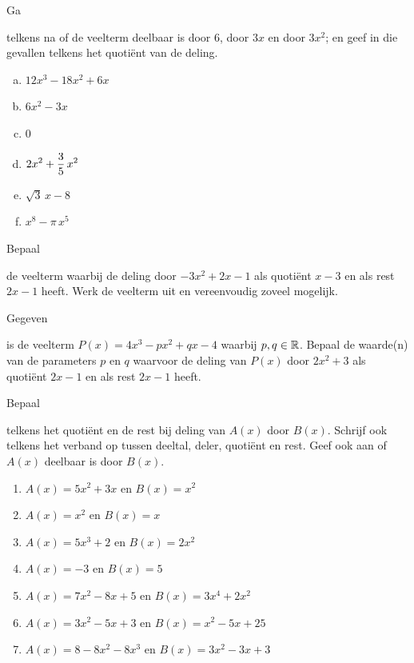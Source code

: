 \documentclass{ximera}
\begin{document}
\begin{exercise} 
\hypertarget{oef2.2}{Ga} telkens na of de veelterm deelbaar is door $6$, door $3x$ en door $3x^2$; en geef in die gevallen telkens het quoti\"ent van de deling.
\begin{multicols}{2}
\begin{enumerate}[(a)]
\item
$12x^3-18x^2+6x$
\item
$6x^2-3x$
\item
$0$
\item
$\displaystyle 2x^2+\frac{3}{5}\,x^2$
\item
$\sqrt{3}\,x-8$
\item
$x^8-\pi\,x^5$
\end{enumerate}
\end{multicols}
\end{exercise} 

\begin{exercise} 
\hypertarget{oef2.3}{Bepaal} de veelterm waarbij de deling door $-3x^2+2x-1$ als quoti\"ent $x-3$ en als rest $2x-1$ heeft. Werk de veelterm uit en vereenvoudig zoveel mogelijk.
\end{exercise} 

\begin{exercise} 
\hypertarget{oef2.4}{Gegeven} is de veelterm $P(x) = 4x^3 - px^2 + qx - 4$ waarbij $p,q \in \mathbb{R}$. Bepaal de waarde(n) van de parameters $p$ en $q$ waarvoor de deling van $P(x)$ door $2x^2+3$ als quoti\"ent $2x-1$ en als rest $2x-1$ heeft. 
\end{exercise} 

\begin{exercise} 
\hypertarget{oef2.5}{Bepaal} telkens het quoti\"ent en de rest bij deling van $A(x)$ door $B(x)$. Schrijf ook telkens het verband op tussen deeltal, deler, quoti\"ent en rest. Geef ook aan of $A(x)$ deelbaar is door $B(x)$.
\begin{enumerate}
\item
$A(x) = 5x^2 + 3x$ \quad en \quad $B(x) = x^2$
\item
$A(x) = x^2$ \quad en \quad $B(x) = x$
\item
$A(x) = 5x^3+2$ \quad en \quad $B(x) = 2x^2$
\item
$A(x) = -3$ \quad en \quad $B(x) = 5$
\item
$A(x) = 7x^2-8x+5$ \quad en \quad $B(x) = 3x^4+2x^2$
\item
$A(x) = 3x^2 - 5x + 3$ \quad en \quad $B(x) = x^2 - 5x + 25$ 
\item
$A(x) = 8-8x^2-8x^3$ \quad en \quad $B(x) = 3x^2 - 3x + 3$ 
\end{enumerate}
\end{exercise} 
\end{document}
